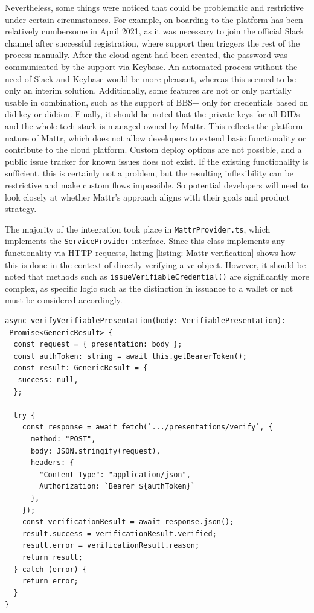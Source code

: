         Nevertheless, some things were noticed that could be problematic and restrictive under certain circumstances. For example, on-boarding to the platform has been relatively cumbersome in April 2021, as it was necessary to join the official Slack channel after successful registration, where support then triggers the rest of the process manually. After the cloud agent had been created, the password was communicated by the support via Keybase. An automated process without the need of Slack and Keybase would be more pleasant, whereas this seemed to be only an interim solution. Additionally, some features are not or only partially usable in combination, such as the support of BBS+ only for credentials based on did:key or did:ion. Finally, it should be noted that the private keys for all \acp{DID} and the whole tech stack is managed owned by Mattr. This reflects the platform nature of Mattr, which does not allow developers to extend basic functionality or contribute to the cloud platform. Custom deploy options are not possible, and a public issue tracker for known issues does not exist. If the existing functionality is sufficient, this is certainly not a problem, but the resulting inflexibility can be restrictive and make custom flows impossible. So potential developers will need to look closely at whether Mattr's approach aligns with their goals and product strategy.
    
        The majority of the integration took place in \texttt{MattrProvider.ts}, which implements the \texttt{ServiceProvider} interface. Since this class implements any functionality via HTTP requests, listing \ref{listing: Mattr verification} shows how this is done in the context of directly verifying a \ac{vc} object. However, it should be noted that methods such as \texttt{issueVerifiableCredential()} are significantly more complex, as specific logic such as the distinction in issuance to a wallet or not must be considered accordingly.
        \newline

\begin{lstlisting}[style=ES6, caption=Example of Mattr verification implementation, label={listing: Mattr verification}]
async verifyVerifiablePresentation(body: VerifiablePresentation): 
 Promise<GenericResult> {
  const request = { presentation: body };
  const authToken: string = await this.getBearerToken();
  const result: GenericResult = {
   success: null,
  };

  try {
    const response = await fetch(`.../presentations/verify`, {
      method: "POST",
      body: JSON.stringify(request),
      headers: { 
        "Content-Type": "application/json", 
        Authorization: `Bearer ${authToken}` 
      },
    });
    const verificationResult = await response.json();
    result.success = verificationResult.verified;
    result.error = verificationResult.reason;
    return result;
  } catch (error) {
    return error;
  }
}\end{lstlisting}
    
